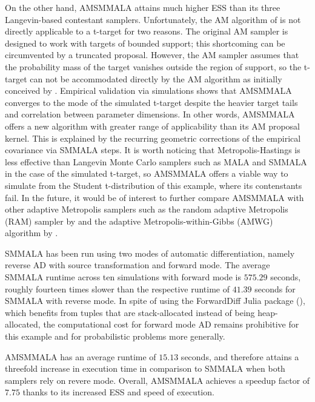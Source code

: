 \documentclass[twoside,11pt]{article}
\begin{document}
On the other hand, AMSMMALA attains much higher ESS than its three Langevin-based contestant samplers. Unfortunately, the AM
algorithm of \cite{haa_sak_tam__ana} is not directly applicable to a t-target for two reasons. The original AM sampler is
designed to work with targets of bounded support; this shortcoming can be circumvented by a truncated proposal. However, the
AM sampler assumes that the probability mass of the target vanishes outside the region of support, so the t-target can not 
be accommodated directly by the AM algorithm as initially conceived by \cite{haa_sak_tam__ana}. Empirical validation via 
simulations shows that AMSMMALA converges to the mode of the simulated t-target despite the heavier target tails and 
correlation between parameter dimensions. In other words, AMSMMALA offers a new algorithm with greater range of applicability
than its AM proposal kernel. This is explained by the recurring geometric corrections of the empirical covariance via SMMALA
steps. It is worth noticing that Metropolis-Hastings is less effective than Langevin Monte Carlo samplers such as MALA and
SMMALA in the case of the simulated t-target, so AMSMMALA offers a viable way to simulate from the Student t-distribution of
this example, where its contenstants fail. In the future, it would be of interest to further compare AMSMMALA with other
adaptive Metropolis samplers such as the random adaptive Metropolis (RAM) sampler by \cite{vih__rob} and the adaptive 
Metropolis-within-Gibbs (AMWG) algorithm by \cite{rob_ros__exa}.

SMMALA has been run using two modes of automatic differentiation, namely reverse AD with source transformation and forward 
mode. The average SMMALA runtime across ten simulations with forward mode is $575.29$ seconds, roughly fourteen times slower
than the respective runtime of $41.39$ seconds for SMMALA with reverse mode. In spite of using the ForwardDiff Julia 
package (\cite{rev_lub_pap__for}), which benefits from tuples that are stack-allocated instead of being heap-allocated, the
computational cost for forward mode AD remains prohibitive for this example and for probabilistic problems more generally.

AMSMMALA has an average runtime of $15.13$ seconds, and therefore attains a threefold increase in execution time in
comparison to SMMALA when both samplers rely on revere mode. Overall, AMSMMALA achieves a speedup factor of $7.75$ thanks to
its increased ESS and speed of execution.
\end{document}
